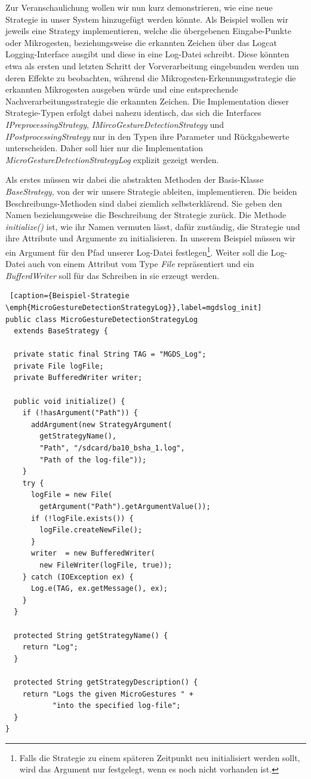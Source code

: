 Zur Veranschaulichung wollen wir nun kurz demonstrieren, wie eine neue Strategie in unser System hinzugefügt werden könnte. Als Beispiel wollen wir jeweils eine Strategy implementieren, welche die übergebenen Eingabe-Punkte oder Mikrogesten, beziehungsweise die erkannten Zeichen über das Logcat Logging-Interface ausgibt und diese in eine Log-Datei schreibt. Diese könnten etwa als ersten und letzten Schritt der Vorverarbeitung eingebunden werden um deren Effekte zu beobachten, während die Mikrogesten-Erkennungsstrategie die erkannten Mikrogesten ausgeben würde und eine entsprechende Nachverarbeitungsstrategie die erkannten Zeichen. Die Implementation dieser Strategie-Typen erfolgt dabei nahezu identisch, das sich die Interfaces \emph{IPreprocessingStrategy}, \emph{IMircoGestureDetectionStrategy} und \emph{IPostprocessingStrategy} nur in den Typen ihre Parameter und Rückgabewerte unterscheiden. Daher soll hier nur die Implementation \emph{MicroGestureDetectionStrategyLog} explizit gezeigt werden.

Als erstes müssen wir dabei die abstrakten Methoden der Basis-Klasse \emph{BaseStrategy}, von der wir unsere Strategie ableiten, implementieren. Die beiden Beschreibungs-Methoden sind dabei ziemlich selbsterklärend. Sie geben den Namen beziehungsweise die Beschreibung der Strategie zurück. Die Methode \emph{initialize()} ist, wie ihr Namen vermuten lässt, dafür zuständig, die Strategie und ihre Attribute und Argumente zu initialisieren. In unserem Beispiel müssen wir ein Argument für den Pfad unserer Log-Datei festlegen\footnote{Falls die Strategie zu einem späteren Zeitpunkt neu initialisiert werden sollt, wird das Argument nur festgelegt, wenn es noch nicht vorhanden ist.}. Weiter soll die Log-Datei auch von einem Attribut vom Type \emph{File} repräsentiert und ein \emph{BufferdWriter} soll für das Schreiben in sie erzeugt werden.

\begin{lstlisting} [caption={Beispiel-Strategie \emph{MicroGestureDetectionStrategyLog}},label=mgdslog_init]
public class MicroGestureDetectionStrategyLog 
  extends BaseStrategy {

  private static final String TAG = "MGDS_Log";
  private File logFile;
  private BufferedWriter writer;

  public void initialize() {
    if (!hasArgument("Path")) {
      addArgument(new StrategyArgument(
        getStrategyName(), 
        "Path", "/sdcard/ba10_bsha_1.log", 
        "Path of the log-file"));
    }
    try {
      logFile = new File(
        getArgument("Path").getArgumentValue());
      if (!logFile.exists()) {
        logFile.createNewFile();
      }
      writer  = new BufferedWriter(
        new FileWriter(logFile, true));
    } catch (IOException ex) {
      Log.e(TAG, ex.getMessage(), ex);
    }
  }

  protected String getStrategyName() {
    return "Log";
  }

  protected String getStrategyDescription() {
    return "Logs the given MicroGestures " + 
           "into the specified log-file";
  }
}
\end{lstlisting}

